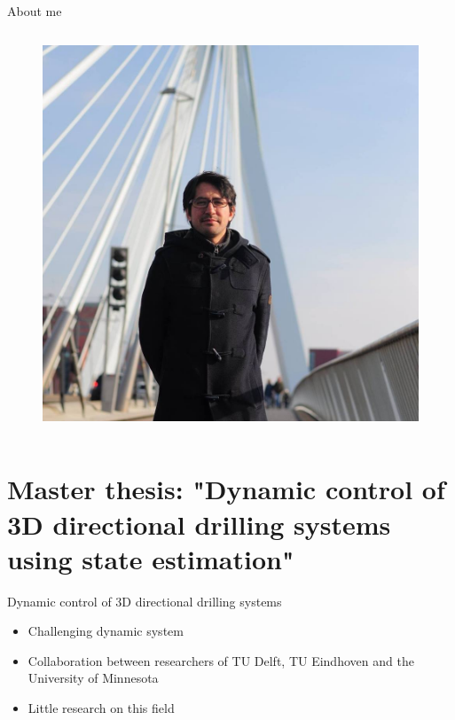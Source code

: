 \documentclass[10pt]{beamer}
\begin{document}
\begin{frame}{About me}
\begin{columns}
\begin{column}{0.4\textwidth}
\begin{figure}[ht]
				\includegraphics[width=1.5\textwidth]{images/yo.jpg}
			\end{figure}			
		\end{column}
	\end{columns}
\end{frame}
\section{Master thesis: "Dynamic control of 3D directional drilling systems using state estimation"}

\begin{frame}{Dynamic control of 3D directional drilling systems}
	\begin{itemize}\setlength\itemsep{2.5em}
		\item Challenging dynamic system
		\item Collaboration between researchers of TU Delft, TU Eindhoven and the University of Minnesota
		\item Little research on this field
	\end{itemize}
\end{frame}
\end{document}
